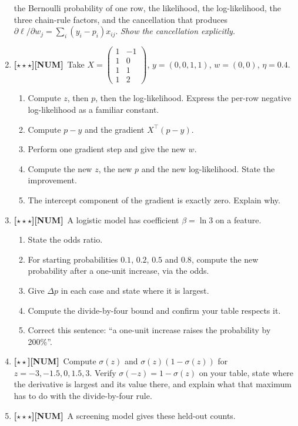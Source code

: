 \documentclass[11pt,a4paper]{article}
\newcommand{\LA}{{\footnotesize\textbf{[$\star\star\star$]}}}
\newcommand{\LB}{{\footnotesize\textbf{[$\star\star$]}}}
\newcommand{\NUM}{{\footnotesize\textbf{[NUM]}}}
\newcommand{\Q}[1]{\item[\textbf{#1}]}
\begin{document}
\begin{enumerate}[leftmargin=2.2cm]
  the Bernoulli probability of one row, the likelihood, the log-likelihood,
  the three chain-rule factors, and the cancellation that produces
  $\partial\ell/\partial w_j = \sum_i (y_i - p_i)x_{ij}$.
  \emph{Show the cancellation explicitly.}
\Q{U5.62}\LA\NUM\ Take $X = \begin{pmatrix}1 & -1\\ 1 & 0\\ 1 & 1\\
  1 & 2\end{pmatrix}$, $y = (0,0,1,1)$, $w = (0,0)$, $\eta = 0.4$.
  \begin{enumerate}[label=(\alph*)]
    \item Compute $z$, then $p$, then the log-likelihood. Express the per-row
      negative log-likelihood as a familiar constant.
    \item Compute $p - y$ and the gradient $X^\top(p-y)$.
    \item Perform one gradient step and give the new $w$.
    \item Compute the new $z$, the new $p$ and the new log-likelihood. State
      the improvement.
    \item The intercept component of the gradient is exactly zero. Explain
      why.
  \end{enumerate}
\Q{U5.63}\LA\NUM\ A logistic model has coefficient $\beta = \ln 3$ on a
  feature.
  \begin{enumerate}[label=(\alph*)]
    \item State the odds ratio.
    \item For starting probabilities $0.1$, $0.2$, $0.5$ and $0.8$, compute
      the new probability after a one-unit increase, via the odds.
    \item Give $\Delta p$ in each case and state where it is largest.
    \item Compute the divide-by-four bound and confirm your table respects it.
    \item Correct this sentence: ``a one-unit increase raises the probability
      by 200\%''.
  \end{enumerate}
\Q{U5.64}\LB\NUM\ Compute $\sigma(z)$ and $\sigma(z)(1-\sigma(z))$ for
  $z = -3, -1.5, 0, 1.5, 3$. Verify $\sigma(-z) = 1 - \sigma(z)$ on your
  table, state where the derivative is largest and its value there, and
  explain what that maximum has to do with the divide-by-four rule.
\Q{U5.65}\LA\NUM\ A screening model gives these held-out counts.
  \begin{center}\begin{tabular}{@{}rrrrr@{}}\toprule

\end{tabular}
\end{center}
\end{enumerate}
\end{document}
